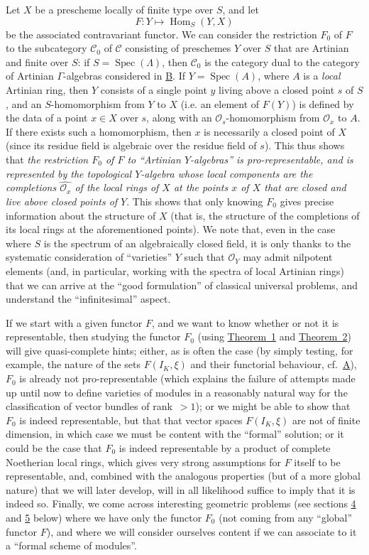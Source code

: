 \documentclass{article}
\newcommand{\scr}[1]{{\mathscr{#1}}}
\renewcommand{\cal}[1]{{\mathcal{#1}}}
\DeclareMathOperator{\Hom}{Hom}
\DeclareMathOperator{\Spec}{Spec}
\newcommand{\oldpage}[1]{\marginpar{\footnotesize$\Big\vert$ \textit{p.~#1}}}
\begin{document}
Let $X$ be a prescheme locally of finite type over $S$, and let
\[
  F\colon Y \mapsto \Hom_S(Y,X)
\]
be the associated contravariant functor.
We can consider the restriction $F_0$ of $F$ to the subcategory $\cal{C}_0$ of $\cal{C}$ consisting of preschemes $Y$ over $S$ that are Artinian and finite over $S$:
if $S=\Spec(\Lambda)$, then $\cal{C}_0$ is the category dual to the category of Artinian $\Gamma$-algebras considered in \hyperref[B]{B}.
If $Y=\Spec(A)$, where $A$ is a \emph{local} Artinian ring, then $Y$ consists of a single point $y$ living above a closed point $s$ of $S$, and an $S$-homomorphism from $Y$ to $X$ (i.e. an element of $F(Y)$) is defined by the data of a point $x\in X$ over $s$, along with an $\scr{O}_s$-homomorphism from $\scr{O}_x$ to $A$.
If there exists such a homomorphism, then $x$ is necessarily a closed point of $X$ (since its residue field is algebraic over the residue field of $s$).
This thus shows that \emph{the restriction $F_0$ of $F$ to ``Artinian $Y$-algebras'' is pro-representable, and is represented by the topological $Y$-algebra whose local components are the completions $\widehat{\scr{O}_x}$ of the local rings of $X$ at the points $x$ of $X$ that are closed and live above closed points of $Y$}.
This shows that only knowing $F_0$ gives precise information about the structure of $X$ (that is, the structure of the completions of its local rings at the aforementioned points).
We note that, even in the case where $S$
\oldpage{195-12}
is the spectrum of an algebraically closed field, it is only thanks to the systematic consideration of ``varieties'' $Y$ such that $\scr{O}_Y$ may admit nilpotent elements (and, in particular, working with the spectra of local Artinian rings) that we can arrive at the ``good formulation'' of classical universal problems, and understand the ``infinitesimal'' aspect.

If we start with a given functor $F$, and we want to know whether or not it is representable, then studying the functor $F_0$ (using \hyperref[B-theorem1]{Theorem~1} and \hyperref[B-theorem2]{Theorem~2}) will give quasi-complete hints;
either, as is often the case (by simply testing, for example, the nature of the sets $F(I_K,\xi)$ and their functorial behaviour, cf.~\hyperref[A]{A}), $F_0$ is already not pro-representable (which explains the failure of attempts made up until now to define varieties of modules in a reasonably natural way for the classification of vector bundles of rank~$>1$);
or we might be able to show that $F_0$ is indeed representable, but that that vector spaces $F(I_K,\xi)$ are not of finite dimension, in which case we must be content with the ``formal'' solution;
or it could be the case that $F_0$ is indeed representable by a product of complete Noetherian local rings, which gives very strong assumptions for $F$ itself to be representable, and, combined with the analogous properties (but of a more global nature) that we will later develop, will in all likelihood suffice to imply that it is indeed so.
Finally, we come across interesting geometric problems (see sections \hyperref[C.4]{4} and \hyperref[C.5]{5} below) where we have only the functor $F_0$ (not coming from any ``global'' functor $F$), and where we will consider ourselves content if we can associate to it a ``formal scheme of modules''.
\end{document}
